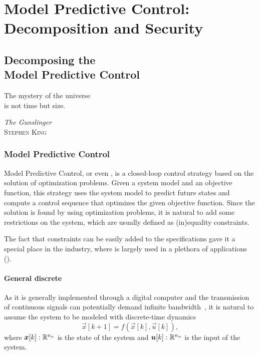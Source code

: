\documentclass[../main.tex]{subfiles}
\begin{document}


\part{Model Predictive Control: Decomposition and Security}

\chapter[Decomposing the Model Predictive Control]{Decomposing the\\ Model Predictive Control}
\epigraph{\centering The mystery of the universe \\ is not time but size.}
{\textit{The Gunslinger}\\\textsc{Stephen King}}

\minitoc

\section{Model Predictive Control}
Model Predictive Control, or even \mpc, is a closed-loop control strategy based
on the solution of optimization problems.
Given a system model and an objective function, this strategy uses the system model to predict future states and compute a control sequence that optimizes the given objective function.
Since the solution is found by using optimization problems, it is natural to add some restrictions on the system, which are usually defined as (in)equality constraints.

The fact that constraints can be easily added to the specifications gave it a special place in the industry, where is largely used in a plethora of applications ().

\subsection{General discrete \mpc\ }
As it is generally implemented through a digital computer and the transmission of continuous signals can potentially demand infinite bandwidth~\cite{HeEtAl2022}, it is natural to assume the system to be modeled with discrete-time dynamics
\begin{equation}
\vec{x}[k+1]=f(\vec{x}[k],\vec{u}[k]),
\end{equation}
where $\boldsymbol{x}[k]:\mathbb{R}^{n_{x}}$ is the state of the system and $\boldsymbol{u}[k]:\mathbb{R}^{n_{u}}$ is the input of the system.
\end{document}
